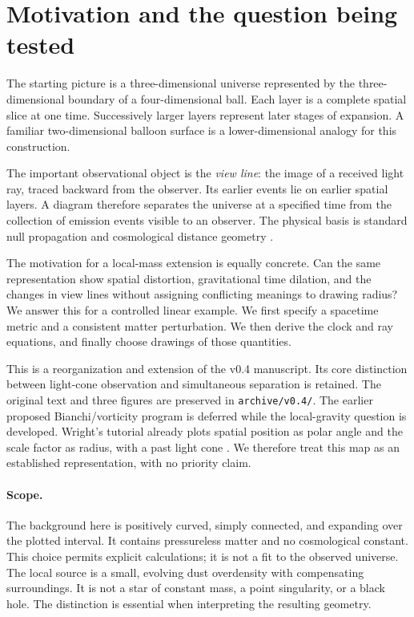 \section{Motivation and the question being tested}
The starting picture is a three-dimensional universe represented by the
three-dimensional boundary of a four-dimensional ball. Each layer is a
complete spatial slice at one time. Successively larger layers represent
later stages of expansion. A familiar two-dimensional balloon surface is
a lower-dimensional analogy for this construction.

The important observational object is the \emph{view line}: the image of
a received light ray, traced backward from the observer. Its earlier events
lie on earlier spatial layers. A diagram therefore separates the universe
at a specified time from the collection of emission events visible to an
observer. The physical basis is standard null propagation and cosmological
distance geometry \citep{Hogg1999,DavisLineweaver2004}.

The motivation for a local-mass extension is equally concrete. Can the same
representation show spatial distortion, gravitational time dilation, and
the changes in view lines without assigning conflicting meanings to drawing
radius? We answer this for a controlled linear example. We first specify a
spacetime metric and a consistent matter perturbation. We then derive the
clock and ray equations, and finally choose drawings of those quantities.

This is a reorganization and extension of the v0.4 manuscript. Its core
distinction between light-cone observation and simultaneous separation is
retained. The original text and three figures are preserved in
\texttt{archive/v0.4/}. The earlier proposed Bianchi/vorticity program is
deferred while the local-gravity question is developed. Wright's tutorial
already plots spatial position as polar angle and the scale factor as
radius, with a past light cone \citep{WrightTutorial}. We therefore treat
this map as an established representation, with no priority claim.

\paragraph{Scope.}
The background here is positively curved, simply connected, and expanding
over the plotted interval. It contains pressureless matter and no cosmological
constant. This choice permits explicit calculations; it is not a fit to the
observed universe. The local source is a small, evolving dust overdensity
with compensating surroundings. It is not a star of constant mass, a point
singularity, or a black hole. The distinction is essential when interpreting
the resulting geometry.
